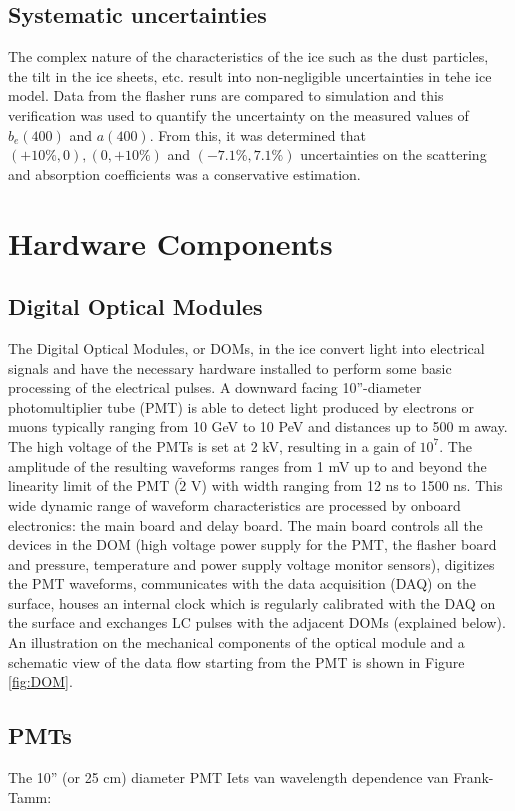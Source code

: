 \subsection{Systematic uncertainties}
The complex nature of the characteristics of the ice such as the dust particles, the tilt in the ice sheets, etc. result into non-negligible uncertainties in tehe ice model. Data from the flasher runs are compared to simulation and this verification was used to quantify the uncertainty on the measured values of $b_e(400)$ and $a(400)$. From this, it was determined that $(+10\%,0), (0,+10\%)$ and $(-7.1\%,7.1\%)$ uncertainties on the scattering and absorption coefficients was a conservative estimation.

\section{Hardware Components}
\subsection{Digital Optical Modules}
\label{subsec:doms}
The Digital Optical Modules, or DOMs, in the ice convert light into electrical signals and have the necessary hardware installed to perform some basic processing of the electrical pulses. A downward facing 10''-diameter photomultiplier tube (PMT) is able to detect light produced by electrons or muons typically ranging from 10 GeV to 10 PeV and distances up to 500 m away. The high voltage of the PMTs is set at 2 kV, resulting in a gain of $10^7$. The amplitude of the resulting waveforms ranges from 1 mV up to and beyond the linearity limit of the PMT ($\tilde 2$ V) with width ranging from 12 ns to 1500 ns. This wide dynamic range of waveform characteristics are processed by onboard electronics: the main board and delay board. The main board controls all the devices in the DOM (high voltage power supply for the PMT, the flasher board and pressure, temperature and power supply voltage monitor sensors), digitizes the PMT waveforms, communicates with the data acquisition (DAQ) on the surface, houses an internal clock which is regularly calibrated with the DAQ on the surface and exchanges LC pulses with the adjacent DOMs (explained below).
An illustration on the mechanical components of the optical module and a schematic view of the data flow starting from the PMT is shown in Figure \ref{fig:DOM}.

\subsection{PMTs}
The 10'' (or 25 cm) diameter PMT \cite{Abbasi:2010vc}
Iets van wavelength dependence van Frank-Tamm:

